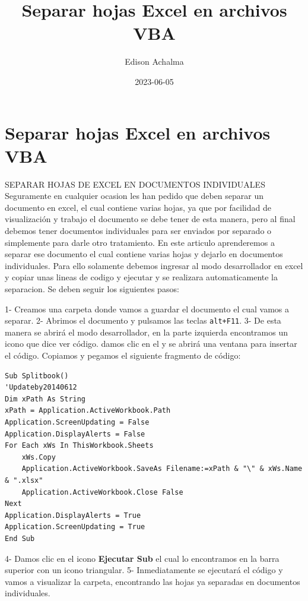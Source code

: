 \documentclass[
  jou,
  floatsintext,
  longtable,
  a4paper,
  nolmodern,
  notxfonts,
  notimes,
  12pt,
  colorlinks=true,linkcolor=blue,citecolor=blue,urlcolor=blue]{apa7}
\title{Separar hojas Excel en archivos VBA}
\author{Edison Achalma}
\affiliation{
{Escuela Profesional de Economía, Universidad Nacional de San Cristóbal
de Huamanga}}
\date{2023-06-05}
\begin{document}
\maketitle


\hypertarget{toc}{}
\tableofcontents
\newpage
\section[Introduction]{Separar hojas Excel en archivos VBA}

\setcounter{secnumdepth}{3}

\setlength\LTleft{0pt}




SEPARAR HOJAS DE EXCEL EN DOCUMENTOS INDIVIDUALES Seguramente en
cualquier ocasion les han pedido que deben separar un documento en
excel, el cual contiene varias hojas, ya que por facilidad de
visualización y trabajo el documento se debe tener de esta manera, pero
al final debemos tener documentos individuales para ser enviados por
separado o simplemente para darle otro tratamiento. En este articulo
aprenderemos a separar ese documento el cual contiene varias hojas y
dejarlo en documentos individuales. Para ello solamente debemos ingresar
al modo desarrollador en excel y copiar unas lineas de codigo y ejecutar
y se realizara automaticamente la separacion. Se deben seguir los
siguientes pasos:

1- Creamos una carpeta donde vamos a guardar el documento el cual vamos
a separar. 2- Abrimos el documento y pulsamos las teclas
\texttt{alt+F11}. 3- De esta manera se abrirá el modo desarrollador, en
la parte izquierda encontramos un icono que dice ver código. damos clic
en el y se abrirá una ventana para insertar el código. Copiamos y
pegamos el siguiente fragmento de código:

\begin{verbatim}
Sub Splitbook()
'Updateby20140612
Dim xPath As String
xPath = Application.ActiveWorkbook.Path
Application.ScreenUpdating = False
Application.DisplayAlerts = False
For Each xWs In ThisWorkbook.Sheets
    xWs.Copy
    Application.ActiveWorkbook.SaveAs Filename:=xPath & "\" & xWs.Name & ".xlsx"
    Application.ActiveWorkbook.Close False
Next
Application.DisplayAlerts = True
Application.ScreenUpdating = True
End Sub
\end{verbatim}

4- Damos clic en el icono \textbf{Ejecutar Sub} el cual lo encontramos
en la barra superior con un icono triangular. 5- Inmediatamente se
ejecutará el código y vamos a visualizar la carpeta, encontrando las
hojas ya separadas en documentos individuales.
\end{document}
